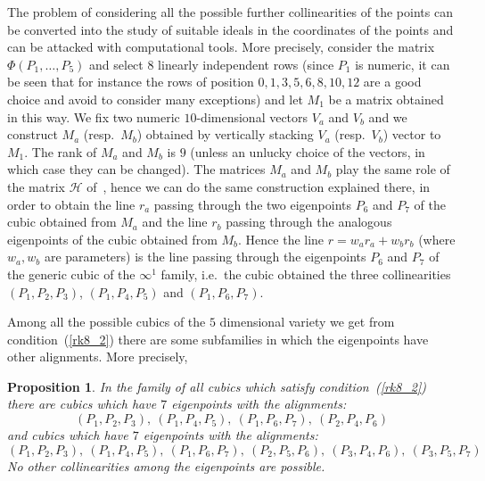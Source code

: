 \documentclass{amsart}
\theoremstyle{plain}
\newtheorem{prop}[lemma]{Proposition}
\theoremstyle{definition}
\begin{document}
The problem of considering all the possible further
collinearities of the points can be converted into the study of suitable
ideals in the coordinates of the points and can be attacked with
computational tools. More precisely,
consider the matrix $\Phi(P_1, \dots, P_5)$ and select $8$ linearly independent
rows (since $P_1$ is numeric, it can be seen that for instance the rows
of position $0, 1, 3, 5, 6, 8, 10, 12$ are a good choice and avoid to consider
many exceptions) and let $M_1$ be a matrix obtained in this way.
We fix two numeric $10$-dimensional vectors $V_a$ and $V_b$ and we construct
$M_a$ (resp.\ $M_b$) obtained by vertically stacking $V_a$ (resp.\ $V_b$)
vector to $M_1$. The rank of $M_a$ and $M_b$ is $9$ (unless an unlucky choice
of the vectors, in which case they can be changed). The matrices $M_a$ and
$M_b$ play the same role of the matrix $\mathcal{H}$
of~, hence we can do the same construction explained
there, in order to obtain the line $r_a$ passing through the two
eigenpoints $P_6$ and $P_7$ of the cubic obtained from $M_a$ and the
line $r_b$ passing through the analogous eigenpoints of the cubic
obtained from $M_b$.
Hence the line $r = w_ar_a+w_br_b$
(where $w_a, w_b$ are parameters) is the line passing through the eigenpoints
$P_6$ and $P_7$
of the generic cubic of the $\infty^1$ family, i.e.\ the cubic obtained
the three collinearities $(P_1, P_2, P_3)$,
$(P_1, P_4, P_5)$ and $(P_1, P_6, P_7)$.



Among all the possible cubics of the $5$ dimensional variety we get from
condition~(\ref{rk8_2}) there are some subfamilies in which the eigenpoints
have other alignments. More precisely,
\begin{prop}
\label{prop:rk8_2B}
In the family of all cubics which satisfy condition~(\ref{rk8_2}) there
are cubics which have $7$ eigenpoints with the alignments:
\[
(P_1, P_2, P_3),\  (P_1, P_4, P_5),\  (P_1, P_6, P_7),\  (P_2, P_4, P_6)
\]
and cubics which have $7$ eigenpoints with the alignments:
\[
(P_1, P_2, P_3),\  (P_1, P_4, P_5), \ (P_1, P_6, P_7),\  (P_2, P_5, P_6),\
(P_3, P_4, P_6),\  (P_3, P_5, P_7)
\]
No other collinearities among the eigenpoints are possible.
\end{prop}
\end{document}
